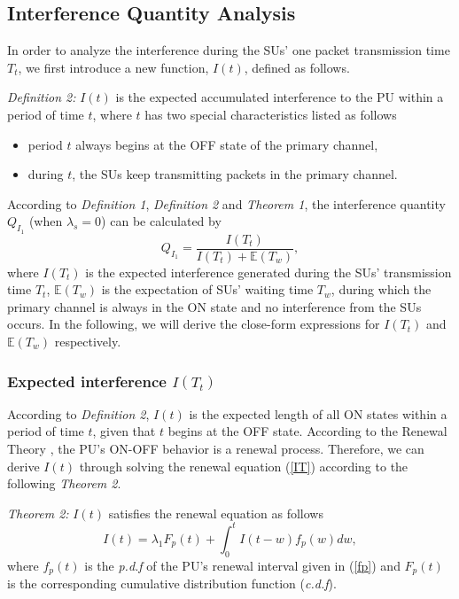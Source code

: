 \documentclass[11pt,draftcls]{IEEEtran}{\onecolumn}
\begin{document}
\subsection{Interference Quantity Analysis}

In order to analyze the interference during the SUs' one packet
transmission time $T_t$, we first introduce a new function, $I(t)$,
defined as follows.

\emph{Definition 2:} $I(t)$ is the expected accumulated interference
to the PU within a period of time $t$, where $t$ has two special
characteristics listed as follows
\begin{itemize}
\item period $t$ always begins at the OFF state of the primary
channel,
\item during $t$, the SUs keep transmitting packets in the primary channel.
\end{itemize}

According to \emph{Definition 1}, \emph{Definition 2} and
\emph{Theorem 1}, the interference quantity $Q_{I_1}$ (when
$\lambda_s=0$) can be calculated by
\begin{equation}\label{qi1}
Q_{I_1}=\frac{I(T_t)}{I(T_t)+\mathbb{E}(T_w)},
\end{equation}
where $I(T_t)$ is the expected interference generated during the
SUs' transmission time $T_t$, $\mathbb{E}(T_w)$ is the expectation
of SUs' waiting time $T_w$, during which the primary channel is
always in the ON state and no interference from the SUs occurs. In
the following, we will derive the close-form expressions for
$I(T_t)$ and $\mathbb{E}(T_w)$ respectively.

\subsubsection{Expected interference $I(T_t)$}\label{It}
According to \emph{Definition 2}, $I(t)$ is the expected length of
all ON states within a period of time $t$, given that $t$ begins at
the OFF state. According to the Renewal Theory \cite{renew}, the
PU's ON-OFF behavior is a renewal process. Therefore, we can derive
$I(t)$ through solving the renewal equation (\ref{IT}) according to
the following \emph{Theorem 2}.

\emph{Theorem 2:} $I(t)$ satisfies the renewal equation as follows
\begin{equation}\label{IT}
I(t)=\lambda_1F_p(t)+\int_{0}^{t}I(t-w)f_p(w)dw,
\end{equation}
where $f_p(t)$ is the \emph{p.d.f} of the PU's renewal interval
given in (\ref{fp}) and $F_p(t)$ is the corresponding cumulative
distribution function (\emph{c.d.f}).
\end{document}
